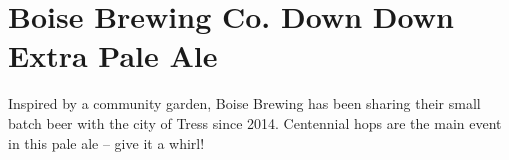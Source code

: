 \documentclass[10pt,oneside]{scrbook}
\begin{document}
\pagebreak

\begin{ingredientsblock}

\begin{malts}
\end{malts}

\begin{hops}
\end{hops}

\begin{yeasts}
\end{yeasts}

\end{ingredientsblock}

\chapter*{Boise Brewing Co. Down Down Extra Pale Ale}

\begin{aboutblock}
Inspired by a community garden, Boise Brewing has been sharing their small batch beer
with the city of Tress since 2014. Centennial hops are the main event in this pale ale -- give it a whirl!
\end{aboutblock}


\begin{methodandtiming}
 
\begin{mashsteps}
\end{mashsteps}

\end{methodandtiming}

\pagebreak
\end{document}
